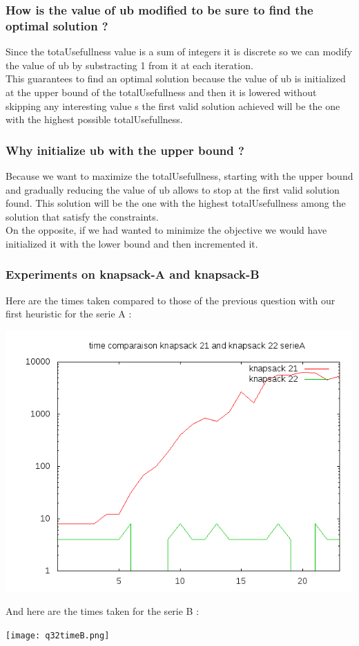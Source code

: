 \documentclass{eplDoc}
\begin{document}
\subsubsection{How is the value of ub modified to be sure to find the optimal solution ?}
Since the totaUsefullness value is a sum of integers it is discrete so we can modify the value of ub by substracting 1 from it at each iteration. \\ 
This guarantees to find an optimal solution because the value of ub is initialized at the upper bound of the totalUsefullness and then it is lowered without skipping any interesting value s the first valid solution achieved will be the one with the highest possible totalUsefullness. 

\subsubsection{Why initialize ub with the upper bound ?}
Because we want to maximize the totalUsefullness, starting with the upper bound and gradually reducing the value of ub allows to stop at the first valid solution found. This solution will be the one with the highest totalUsefullness among the solution that satisfy the constraints. \\ 
On the opposite, if we had wanted to minimize the objective we would have initialized it with the lower bound and then incremented it.

\subsubsection{Experiments on knapsack-A and knapsack-B}
Here are the times taken compared to those of the previous question with our first heuristic for the serie A : 
\begin{center}
\includegraphics[width=\columnwidth]{q32timeA.png}%
\end{center}
And here are the times taken for the serie B : 
\begin{center}
\texttt{[image: q32timeB.png]}%
\end{center}
\end{document}
